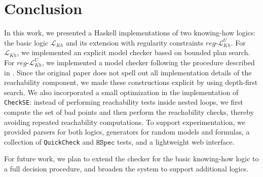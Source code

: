 
\section{Conclusion}\label{sec:Conclusion}

In this work, we presented a Haskell implementations of two knowing-how logics: the basic logic $\mathcal{L}_{Kh}$ and its extension with regularity constraints $reg\text{-}\mathcal{L}^U_{Kh}$. For $\mathcal{L}_{Kh}$, we implemented an explicit model checker based on bounded plan search. For $reg\text{-}\mathcal{L}^U_{Kh}$, we implemented a model checker following the procedure described in \cite{Demri2023}. Since the original paper does not spell out all implementation details of the reachability component, we made these constructions explicit by using depth-first search. We also incorporated a small optimization in the implementation of \texttt{CheckSE}: instead of performing reachability tests inside nested loops, we first compute the set of bad points and then perform the reachability checks, thereby avoiding repeated reachability computations. To support experimentation, we provided parsers for both logics, generators for random models and formulas, a collection of \texttt{QuickCheck} and $\texttt{HSpec}$ tests, and a lightweight web interface. 

For future work, we plan to extend the checker for the basic knowing-how logic to a full decision procedure, and broaden the system to support additional logics.

